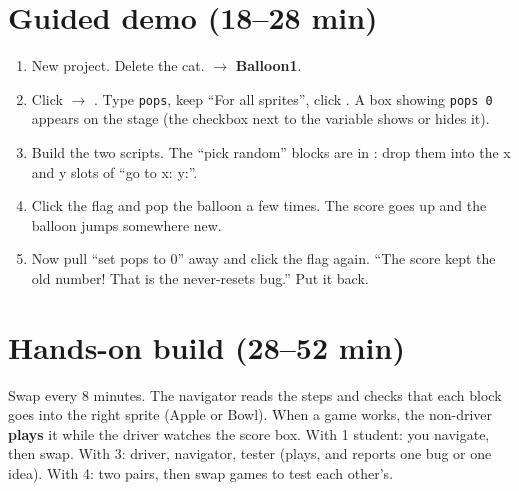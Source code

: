 \section{Guided demo (18--28 min)}
\begin{workedexample}
\begin{enumerate}[leftmargin=1.4em,itemsep=1pt]
  \item New project. Delete the cat.  $\rightarrow$ \textbf{Balloon1}.
  \item Click  $\rightarrow$ . Type \texttt{pops}, keep \enquote{For all sprites}, click . A box showing \texttt{pops 0} appears on the stage (the checkbox next to the variable shows or hides it).
  \item Build the two scripts. The \enquote{pick random} blocks are in : drop them into the x and y slots of \enquote{go to x: y:}.
  \item Click the flag and pop the balloon a few times. The score goes up and the balloon jumps somewhere new.
  \item Now pull \enquote{set pops to 0} away and click the flag again. \enquote{The score kept the old number! That is the never-resets bug.} Put it back.
\end{enumerate}
\begin{center}
\begin{scratch}[scale=0.8]
\end{scratch}
\hspace{0.5cm}
\begin{scratch}[scale=0.8]
\end{scratch}
\end{center}
\end{workedexample}

\section{Hands-on build (28--52 min)}
\begin{pairroles}
Swap every 8 minutes. The navigator reads the steps and checks that each block goes into the right sprite (Apple or Bowl). When a game works, the non-driver \textbf{plays} it while the driver watches the score box. With 1 student: you navigate, then swap. With 3: driver, navigator, tester (plays, and reports one bug or one idea). With 4: two pairs, then swap games to test each other's.
\end{pairroles}

